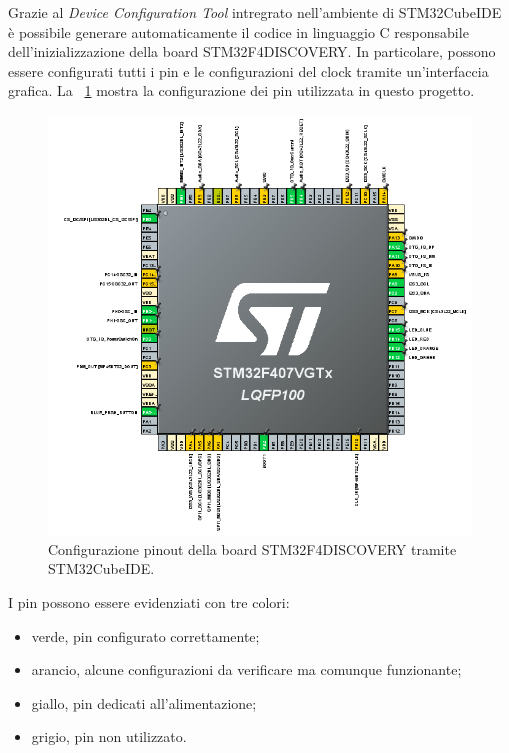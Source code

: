 Grazie al \textit{Device Configuration Tool} intregrato nell'ambiente di STM32CubeIDE è possibile generare automaticamente il codice in linguaggio C responsabile dell'inizializzazione della board STM32F4DISCOVERY. In particolare, possono essere configurati tutti i pin e le configurazioni del clock tramite un'interfaccia grafica. La \Fig~\ref{fig:Pinout} mostra la configurazione dei pin utilizzata in questo progetto. 
\begin{figure}[tbh]
	\centering
	\includegraphics[width=0.9\linewidth]{ImageFiles/Firmware/Pinout}
	\caption{Configurazione pinout della board STM32F4DISCOVERY tramite STM32CubeIDE.}
	\label{fig:Pinout}
\end{figure}
I pin possono essere evidenziati con tre colori:
\begin{itemize}
	\item verde, pin configurato correttamente;
	\item arancio, alcune configurazioni da verificare ma comunque funzionante;
	\item giallo, pin dedicati all'alimentazione;
	\item grigio, pin non utilizzato.
\end{itemize}
